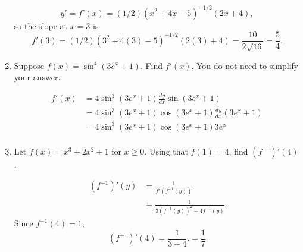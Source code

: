 \documentclass[12pt]{article}
\begin{document}
\begin{enumerate}
\medskip
{}
\[
y' = f'(x) = (1/2)(x^2 + 4x - 5)^{-1/2}(2x + 4),
\]
so the slope at $x = 3$ is
\[
f'(3) = (1/2)(3^2 + 4(3) - 5)^{-1/2}(2(3) + 4)
= \frac{10}{2\sqrt{16}}
= \frac{5}{4}.
\]
\bigskip

\item Suppose $f(x) = \sin^4(3e^x + 1)$. Find $f'(x)$. 
You do not need to simplify your answer.

\medskip
{}
\begin{align*}
f'(x) &= 4\sin^3(3e^x+1)\frac{dy}{dx}\sin(3e^x+1)\\
&= 4\sin^3(3e^x+1)\cos(3e^x+1)\frac{dy}{dx}(3e^x+1)\\
&= 4\sin^3(3e^x+1)\cos(3e^x+1)3e^x\\
\end{align*}

\bigskip

\item Let $f(x) = x^3 + 2x^2 + 1$ for $x \geq 0$. 
Using that $f(1) = 4$, find $(f^{-1})'(4)$.

\medskip
{}
\begin{align*}
(f^{-1})'(y) &= \frac{1}{f'(f^{-1}(y))}\\
&= \frac{1}{3(f^{-1}(y))^2 + 4f^{-1}(y)}
\end{align*}
Since $f^{-1}(4) = 1$,
\[
(f^{-1})'(4) = \frac{1}{3 + 4}.
= \frac{1}{7} 
\]
\end{enumerate}
\end{document}
